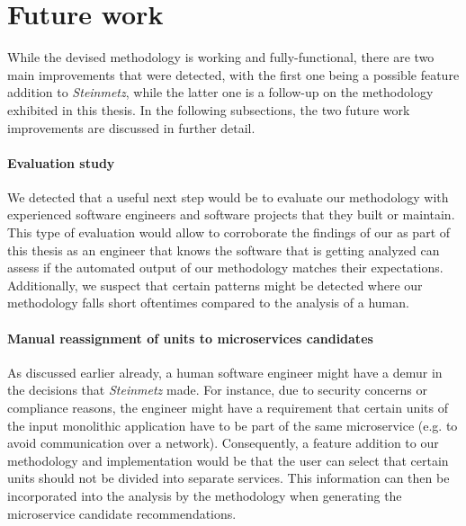 \documentclass[12pt,a4paper]{report}
\begin{document}
\section{Future work} \label{sect:future-work}

While the devised methodology is working and fully-functional, there are two
main improvements that were detected, with the first one being a possible
feature addition to \textit{Steinmetz}, while the latter one is a follow-up
on the methodology exhibited in this thesis. In the following subsections,
the two future work improvements are discussed in further detail.

\paragraph{Evaluation study}
We detected that a useful next step would be to evaluate our methodology
with experienced software engineers and software projects that they built
or maintain. This type of evaluation would allow to corroborate the findings
of our \textit{} as part of this thesis as an engineer
that knows the software that is getting analyzed can assess if the automated
output of our methodology matches their expectations. Additionally, we suspect
that certain patterns might be detected where our methodology falls short oftentimes
compared to the analysis of a human.

\paragraph{Manual reassignment of units to microservices candidates}
As discussed earlier already, a human software engineer might have a demur
in the decisions that \textit{Steinmetz} made. For instance, due to
security concerns or compliance reasons, the engineer might have a requirement
that certain units of the input monolithic application have to be part of
the same microservice (e.g. to avoid communication over a network).
Consequently, a feature addition to our methodology and implementation
would be that the user can select that certain units should not be divided
into separate services. This information can then be incorporated into the
analysis by the methodology when generating the microservice candidate
recommendations.
\end{document}
